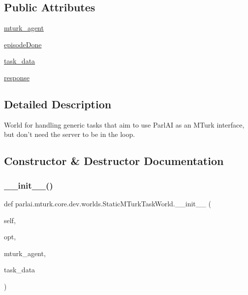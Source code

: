 \subsection*{Public Attributes}
\begin{DoxyCompactItemize}
\item 
\hyperlink{classparlai_1_1mturk_1_1core_1_1dev_1_1worlds_1_1StaticMTurkTaskWorld_aab38e48f7fd04122213d70e5b9c0786c}{mturk\+\_\+agent}
\item 
\hyperlink{classparlai_1_1mturk_1_1core_1_1dev_1_1worlds_1_1StaticMTurkTaskWorld_a9d5943473ba788a5bf6cf6f439d9a2b8}{episode\+Done}
\item 
\hyperlink{classparlai_1_1mturk_1_1core_1_1dev_1_1worlds_1_1StaticMTurkTaskWorld_a18b4236bb2e5867aeb7a6d3c846712ac}{task\+\_\+data}
\item 
\hyperlink{classparlai_1_1mturk_1_1core_1_1dev_1_1worlds_1_1StaticMTurkTaskWorld_ac6d8c12abc3a318337ab68b546631c79}{response}
\end{DoxyCompactItemize}


\subsection{Detailed Description}
\begin{DoxyVerb}World for handling generic tasks that aim to use ParlAI as an MTurk interface, but
don't need the server to be in the loop.
\end{DoxyVerb}
 

\subsection{Constructor \& Destructor Documentation}
\mbox{\label{classparlai_1_1mturk_1_1core_1_1dev_1_1worlds_1_1StaticMTurkTaskWorld_aaa2fbb9c20a2a3fb4e7bb795ba2391fa}} 
\subsubsection{\texorpdfstring{\+\_\+\+\_\+init\+\_\+\+\_\+()}{\_\_init\_\_()}}
{\footnotesize\ttfamily def parlai.\+mturk.\+core.\+dev.\+worlds.\+Static\+M\+Turk\+Task\+World.\+\_\+\+\_\+init\+\_\+\+\_\+ (\begin{DoxyParamCaption}\item[{}]{self,  }\item[{}]{opt,  }\item[{}]{mturk\+\_\+agent,  }\item[{}]{task\+\_\+data }\end{DoxyParamCaption})}

